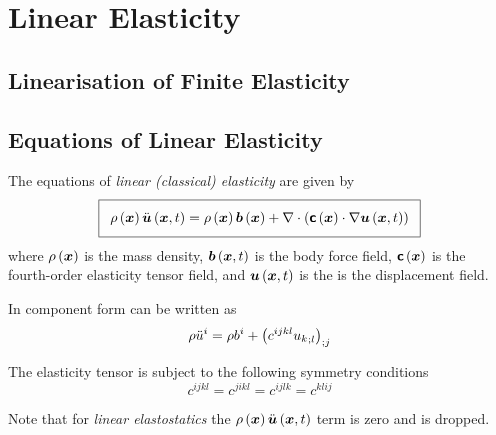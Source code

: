 \section{Linear Elasticity}
\label{sec:LinearElasticity}


\subsection{Linearisation of Finite Elasticity}

\subsection{Equations of Linear Elasticity}

The equations of \emph{linear (classical) elasticity} are given by
\begin{equation}
  \addtolength{\fboxsep}{5pt}
  \boxed{
    \fnof{\rho}{\vectr{x}}\fnof{\ddot{\vectr{u}}}{\vectr{x},t}=\fnof{\rho}{\vectr{x}}\fnof{\vectr{b}}{\vectr{x}}+
    \divergence{}{\pbrac{\dotprod{\fnof{\tensorfour{c}}{\vectr{x}}}{\gradient{}{\fnof{\vectr{u}}{\vectr{x},t}}}}}
  }
  \label{eqn:LinearElasticityEquation}
\end{equation}
where $ \rho\left(  \boldsymbol{x}  \right) $ is the mass density,
$  \boldsymbol{b} \left(  \boldsymbol{x} ,t \right) $ is the body force field,
$ \boldsymbol{\mathsf{c}}\left(  \boldsymbol{x}  \right) $ is the fourth-order elasticity tensor
field, and $\fnof{\vectr{u}}{\vect{x},t}$ is the is the displacement field.

In component form  can be written as
\begin{equation}
  \rho{\ddot{u}}^{i}=\rho b^{i} +  {\left( c^{ijkl} {u_{k}}_{;l}  \right)}_{;j} 
\end{equation}

The elasticity tensor is subject to the following symmetry conditions
\begin{equation}
  c^{ijkl}=c^{jikl}=c^{ijlk}=c^{klij}
\end{equation}

Note that for \emph{linear elastostatics} the
$ \rho\left(  \boldsymbol{x}  \right)  \ddot{ \boldsymbol{u} }\left(  \boldsymbol{x} ,t \right) $ term is zero and
is dropped. 
 
